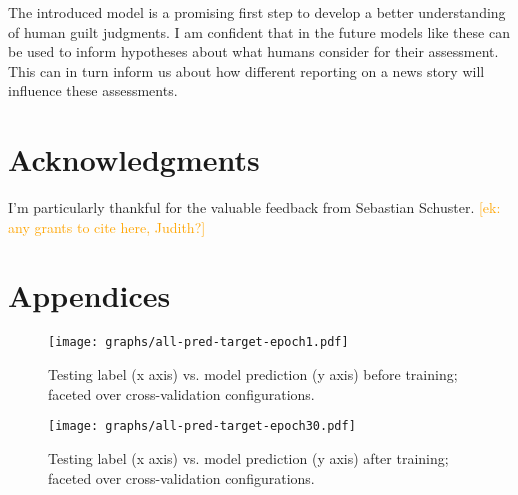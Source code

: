 \documentclass[11pt,a4paper]{article}
\newcommand{\ek}[1]{\textcolor{Orange}{[ek: #1]}}
\begin{document}
The introduced model is a promising first step to develop a better understanding of human guilt judgments. I am confident that in the future models like these can be used to inform hypotheses about what humans consider for their assessment. This can in turn inform us about how different reporting on a news story will influence these assessments.



\section*{Acknowledgments}

I'm particularly thankful for the valuable feedback from Sebastian Schuster. \ek{any grants to cite here, Judith?} \\







\onecolumn
\section{Appendices}
\label{sec:appendix}

\begin{figure*}[!htb]
	\texttt{[image: graphs/all-pred-target-epoch1.pdf]}
	\caption{Testing label (x axis) vs. model prediction (y axis) before training; faceted over cross-validation configurations.}
	\label{fig:app-corr-pretraining}
\end{figure*}

\begin{figure*}[!htb]
	\texttt{[image: graphs/all-pred-target-epoch30.pdf]}
	\caption{Testing label (x axis) vs. model prediction (y axis) after training; faceted over cross-validation configurations.}
	\label{fig:app-corr-posttraining}
\end{figure*}
\end{document}
